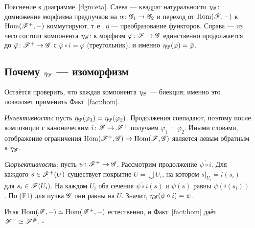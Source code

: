 Пояснение к диаграмме~\ref{dgm:eta}. Слева --- квадрат
натуральности $\eta_{\mathscr{G}}$: домножение морфизма предпучков
на $\alpha\colon\mathscr{G}_1\to\mathscr{G}_2$ и переход от
$\operatorname{Hom}(\mathscr{F},-)$ к $\operatorname{Hom}(\mathscr{F}^{+},-)$ коммутируют, т.\,е.\
$\eta$ --- преобразование функторов. Справа --- из чего состоит
компонента $\eta_{\mathscr{G}}$: к морфизм $\varphi\colon\mathscr{F}\to
\mathscr{G}$ единственно продолжается до $\bar\varphi\colon\mathscr{F}^{+}
\to\mathscr{G}$ с $\bar\varphi\circ i=\varphi$ (треугольник), и
именно $\eta_{\mathscr{G}}(\varphi)=\bar\varphi$.

\subsection{Почему $\eta_{\mathscr{G}}$ --- изоморфизм}
Остаётся проверить, что каждая компонента $\eta_{\mathscr{G}}$ ---
биекция; именно это позволяет применить Факт~\ref{fact:hom}.
\begin{bullets}
\item \emph{Инъективность}: пусть $\eta_{\mathscr{G}}(\varphi_1)=
 \eta_{\mathscr{G}}(\varphi_2)$. Продолжения совпадают, поэтому после
 композиции с каноническим $i\colon\mathscr{F}\to\mathscr{F}^{+}$ получаем
 $\varphi_1=\varphi_2$. Иными словами, отображение ограничения
 $\operatorname{Hom}(\mathscr{F}^{+},\mathscr{G})\to\operatorname{Hom}(\mathscr{F},\mathscr{G})$ является левым
 обратным к $\eta_{\mathscr{G}}$.
\item \emph{Сюръективность}: пусть $\psi\colon\mathscr{F}^{+}\to\mathscr{G}$.
 Рассмотрим продолжение $\overline{\psi\circ i}$. Для каждого
 $s\in\mathscr{F}^{+}(U)$ существует покрытие $U=\bigcup U_i$, на котором
 $s|_{U_i}=i(s_i)$ для $s_i\in\mathscr{F}(U_i)$. На каждом $U_i$ оба
 сечения $\overline{\psi\circ i}(s)$ и $\psi(s)$ равны
 $\psi(i(s_i))$. По (F1) для пучка $\mathscr{G}$ они равны на $U$.
 Значит, $\eta_{\mathscr{G}}(\psi\circ i)=\psi$.
\end{bullets}

Итак $\operatorname{Hom}(\mathscr{F},-)\simeq\operatorname{Hom}(\mathscr{F}^{+},-)$ естественно, и
Факт~\ref{fact:hom} даёт $\mathscr{F}^{+}\simeq\mathscr{F}^{\#}$.
\hfill$\square$

\begin{bookbox}
\end{bookbox}

